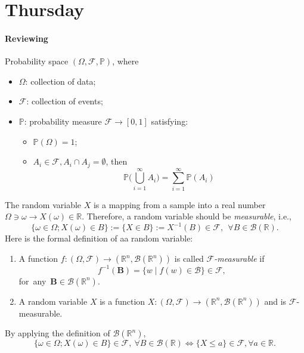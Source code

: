 
\section{Thursday}
\paragraph{Reviewing}
Probability space $(\Omega,\mathcal{F},\mathbb{P})$, where
\begin{itemize}
\item
$\Omega$: collection of data;
\item
$\mathcal{F}$: collection of events;
\item
$\mathbb{P}$: probability measure $\mathcal{F}\to[0,1]$ satisfying:
\begin{itemize}
\item
$\mathbb{P}(\Omega)=1$;
\item
$A_i\in\mathcal{F}, A_i\cap A_j=\emptyset$, then
\[
\mathbb{P}\bigg(
\bigcup_{i=1}^\infty A_i
\bigg)
=
\sum_{i=1}^\infty\mathbb{P}(A_i)
\]
\end{itemize}
\end{itemize}


The random variable $X$ is a mapping from a sample into a real number $\Omega\ni\omega\to X(\omega)\in\mathbb{R}$.
Therefore, a random variable should be \emph{measurable}, i.e., 
\[
\{\omega\in\Omega; X(\omega)\in B\}:=\{X\in B\}:=X^{-1}(B)\in\mathcal{F}, ~~\forall B\in\mathcal{B}(\mathbb{R}).
\]
Here is the formal definition of aa random variable:
\begin{definition}
\begin{enumerate}
\item
A function $f:(\Omega,\mathcal{F})\to(\mathbb{R}^n,\mathcal{B}(\mathbb{R}^n))$ is called \emph{$\mathcal{F}$-measurable} if
\[
f^{-1}(\bm B)=\{w\mid f(w)\in\mathcal{B}\}\in\mathcal{F},
\]
\mbox{for any $\bm B\in\mathcal{B}(\mathbb{R}^n)$.}
\item
A random variable $X$ is a function $X:(\Omega,\mathcal{F})\to(\mathbb{R}^n,\mathcal{B}(\mathbb{R}^n))$ and is $\mathcal{F}$-measurable.
\end{enumerate}
\end{definition}
\begin{remark}
By applying the definition of $\mathcal{B}(\mathbb{R}^n)$,
\[
\{\omega\in\Omega; X(\omega)\in B\}\in\mathcal{F},~\forall B\in\mathcal{B}(\mathbb{R})\Longleftrightarrow
\{X\le a\}\in\mathcal{F},\forall a\in\mathbb{R}.
\]
\end{remark}

